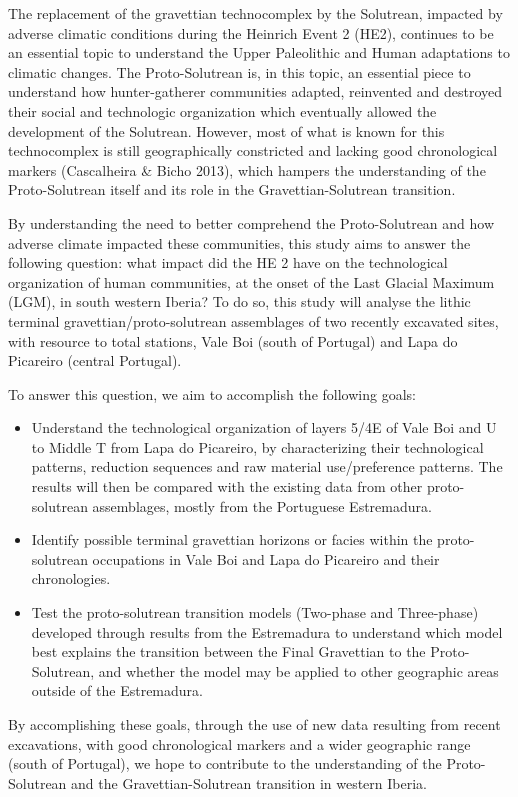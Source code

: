 \documentclass[12pt,twoside]{reedthesis}
\begin{document}
The replacement of the gravettian technocomplex by the Solutrean, impacted by adverse climatic conditions during the Heinrich Event 2 (HE2), continues to be an essential topic to understand the Upper Paleolithic and Human adaptations to climatic changes. The Proto-Solutrean is, in this topic, an essential piece to understand how hunter-gatherer communities adapted, reinvented and destroyed their social and technologic organization which eventually allowed the development of the Solutrean. However, most of what is known for this technocomplex is still geographically constricted and lacking good chronological markers (Cascalheira \& Bicho 2013), which hampers the understanding of the Proto-Solutrean itself and its role in the Gravettian-Solutrean transition.

By understanding the need to better comprehend the Proto-Solutrean and how adverse climate impacted these communities, this study aims to answer the following question: what impact did the HE 2 have on the technological organization of human communities, at the onset of the Last Glacial Maximum (LGM), in south western Iberia? To do so, this study will analyse the lithic terminal gravettian/proto-solutrean assemblages of two recently excavated sites, with resource to total stations, Vale Boi (south of Portugal) and Lapa do Picareiro (central Portugal).

To answer this question, we aim to accomplish the following goals:
\begin{itemize}
\item
  Understand the technological organization of layers 5/4E of Vale Boi and U to Middle T from Lapa do Picareiro, by characterizing their technological patterns, reduction sequences and raw material use/preference patterns. The results will then be compared with the existing data from other proto-solutrean assemblages, mostly from the Portuguese Estremadura.
\item
  Identify possible terminal gravettian horizons or facies within the proto-solutrean occupations in Vale Boi and Lapa do Picareiro and their chronologies.
\item
  Test the proto-solutrean transition models (Two-phase and Three-phase) developed through results from the Estremadura to understand which model best explains the transition between the Final Gravettian to the Proto-Solutrean, and whether the model may be applied to other geographic areas outside of the Estremadura.
\end{itemize}
By accomplishing these goals, through the use of new data resulting from recent excavations, with good chronological markers and a wider geographic range (south of Portugal), we hope to contribute to the understanding of the Proto-Solutrean and the Gravettian-Solutrean transition in western Iberia.
\end{document}
